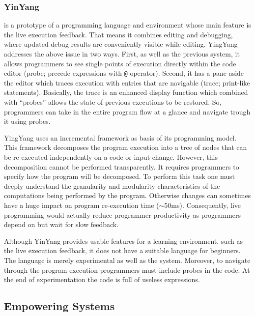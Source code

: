 \subsubsection{YinYang~\cite{mcdirmid2013usable}} is a prototype of a programming language and environment whose main feature is the live execution feedback. That means it combines editing and debugging, where updated debug results are conveniently visible while editing. YingYang addresses the above issue in two ways. First, as well as the previous system, it allows programmers to see single points of execution directly within the code editor (probe; precede expressions with \texttt{@} operator). Second, it has a pane aside the editor which traces execution with entries that are navigable (trace; print-like statements). Basically, the trace is an enhanced display function which combined with ``probes'' allows the state of previous executions to be restored. So, programmers can take in the entire program flow at a glance and navigate trough it using probes.

YingYang uses an incremental framework as basis of its programming model. This framework decomposes the program execution into a tree of nodes that can be re-executed independently on a code or input change. However, this decomposition cannot be performed transparently. It requires programmers to specify how the program will be decomposed. To perform this task one must deeply understand the granularity and modularity characteristics of the computations being performed by the program. Otherwise changes can sometimes have a huge impact on program re-execution time ($\sim$50ms). Consequently, live programming would actually reduce programmer productivity as programmers depend on but wait for slow feedback.

Although YinYang provides usable features for a learning environment, such as the live execution feedback, it does not have a suitable language for beginners. The language is merely experimental as well as the system. Moreover, to navigate through the program execution programmers must include probes in the code. At the end of experimentation the code is full of useless expressions.

\subsection{Empowering Systems}
\label{sec:es}

